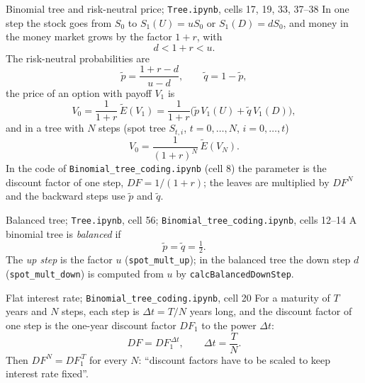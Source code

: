 \documentclass[11pt,a4paper]{article}
\newcommand{\subhead}[1]{\par\medskip\noindent{\large\bfseries #1}\par\smallskip\noindent\ignorespaces}
\newcommand{\Et}{\tilde{E}}
\begin{document}
\subhead{Results used.}

\begin{defbox}{Binomial tree and risk-neutral price; \texttt{Tree.ipynb}, cells 17, 19, 33, 37--38}
In one step the stock goes from $S_0$ to $S_1(U)=uS_0$ or $S_1(D)=dS_0$, and money in the money market grows by the factor $1+r$, with
\[
d<1+r<u .
\]
The risk-neutral probabilities are
\begin{equation}\label{eq:pq}
\tilde p=\frac{1+r-d}{u-d},\qquad \tilde q=1-\tilde p ,
\end{equation}
the price of an option with payoff $V_1$ is
\begin{equation}\label{eq:V0}
V_0=\frac{1}{1+r}\,\Et(V_1)=\frac{1}{1+r}\bigl(\tilde p\,V_1(U)+\tilde q\,V_1(D)\bigr),
\end{equation}
and in a tree with $N$ steps (spot tree $S_{t,i}$, $t=0,\dots,N$, $i=0,\dots,t$)
\begin{equation}\label{eq:VN}
V_0=\frac{1}{(1+r)^N}\,\Et(V_N).
\end{equation}
In the code of \texttt{Binomial\_tree\_coding.ipynb} (cell 8) the parameter is the discount factor of one step, $DF=1/(1+r)$; the leaves are multiplied by $DF^N$ and the backward steps use $\tilde p$ and $\tilde q$.
\end{defbox}

\begin{defbox}{Balanced tree; \texttt{Tree.ipynb}, cell 56; \texttt{Binomial\_tree\_coding.ipynb}, cells 12--14}
A binomial tree is \emph{balanced} if
\begin{equation}\label{eq:bal}
\tilde p=\tilde q=\tfrac12 .
\end{equation}
The \emph{up step} is the factor $u$ (\texttt{spot\_mult\_up}); in the balanced tree the down step $d$ (\texttt{spot\_mult\_down}) is computed from $u$ by \texttt{calcBalancedDownStep}.
\end{defbox}

\begin{defbox}{Flat interest rate; \texttt{Binomial\_tree\_coding.ipynb}, cell 20}
For a maturity of $T$ years and $N$ steps, each step is $\Delta t=T/N$ years long, and the discount factor of one step is the one-year discount factor $DF_1$ to the power $\Delta t$:
\begin{equation}\label{eq:flat}
DF=DF_1^{\,\Delta t},\qquad \Delta t=\frac{T}{N}.
\end{equation}
Then $DF^N=DF_1^{\,T}$ for every $N$: ``discount factors have to be scaled to keep interest rate fixed''.
\end{defbox}
\end{document}
